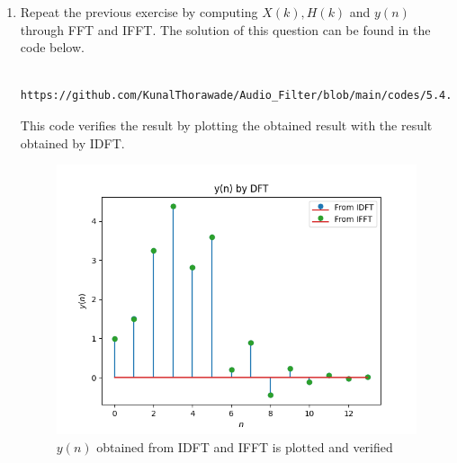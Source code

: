 \documentclass[journal,12pt,twocolumn]{IEEEtran}
\theoremstyle{remark}
\begin{document}
\begin{enumerate}[label=\thesection.\arabic*]
																																																											  \item Repeat the previous exercise by computing $X(k), H(k)$ and $y(n)$ through FFT and IFFT.
																																																											  \solution The solution of this question can be found in the code below.
																																																											  \begin{lstlisting}
																																																											  https://github.com/KunalThorawade/Audio_Filter/blob/main/codes/5.4.py
																																																											  \end{lstlisting}
																																																											  This code verifies the result by plotting the obtained result with the result obtained by IDFT.
																																																											  \begin{figure}[H]
																																																											  \centering
																																																											  \includegraphics[width=\columnwidth]{figs/yn_verf_5.4.png}
																																																											  \caption{$y(n)$ obtained from IDFT and IFFT is plotted and verified}
																																																											  \label{fig:yn_verf_5.4}
																																																											  \end{figure}


\end{enumerate}
\end{document}
